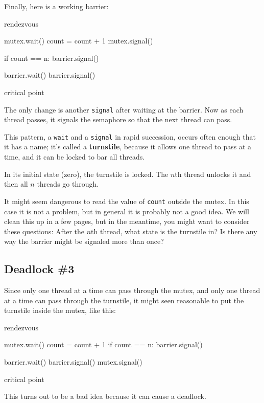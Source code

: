 \documentclass{book}
\begin{document}
Finally, here is a working barrier:

\begin{unbreakable}[title={Barrier solution}]{}
rendezvous

mutex.wait()
    count = count + 1
mutex.signal()

if count == n: barrier.signal()

barrier.wait()
barrier.signal()

critical point
\end{unbreakable}

The only change is another {\tt signal} after waiting
at the barrier.  Now as each thread passes, it signals the
semaphore so that the next thread can pass.

This pattern, a {\tt wait} and a {\tt signal} in rapid
succession, occurs often enough that it has a name;
it's called a {\bf turnstile}, because it allows one thread to pass
at a time, and it can be locked to bar all threads.

In its initial state (zero), the turnstile is locked.  The $n$th
thread unlocks it and then all $n$ threads go through.

It might seem dangerous to read the value of {\tt count} outside the
mutex.  In this case it is not a problem, but in general it is
probably not a good idea.  We will clean this up in a few pages, but
in the meantime, you might want to consider these questions: After the
$n$th thread, what state is the turnstile in?  Is there any way the
barrier might be signaled more than once?



\subsection {Deadlock \#3}

Since only one thread at a time can pass through the
mutex, and only one thread at a time can pass through
the turnstile, it might seen reasonable to put the
turnstile inside the mutex, like this:

\begin{unbreakable}[title={Bad barrier solution}]{}
rendezvous

mutex.wait()
    count = count + 1
    if count == n: barrier.signal()

    barrier.wait()
    barrier.signal()
mutex.signal()

critical point
\end{unbreakable}

This turns out to be a bad idea because it can cause a
deadlock.
\end{document}
